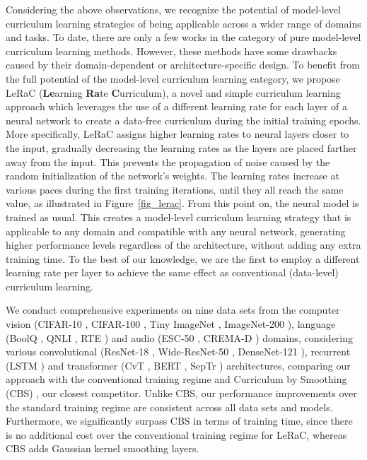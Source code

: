 \documentclass[10pt,twocolumn,letterpaper]{article}
\begin{document}
Considering the above observations, we recognize the potential of model-level curriculum learning strategies of being applicable across a wider range of domains and tasks. To date, there are only a few works \cite{Burduja-ICIP-2021,Karras-ICLR-2018,Sinha-NIPS-2020} in the category of pure model-level curriculum learning methods. However, these methods have some drawbacks caused by their domain-dependent or architecture-specific design. To benefit from the full potential of the model-level curriculum learning category, we propose LeRaC (\textbf{Le}arning \textbf{Ra}te \textbf{C}urriculum), a novel and simple curriculum learning approach which leverages the use of a different learning rate for each layer of a neural network to create a data-free curriculum during the initial training epochs. More specifically, LeRaC assigns higher learning rates to neural layers closer to the input, gradually decreasing the learning rates as the layers are placed farther away from the input. This prevents the propagation of noise caused by the random initialization of the network's weights. The learning rates increase at various paces during the first training iterations, until they all reach the same value, as illustrated in Figure~\ref{fig_lerac}. From this point on, the neural model is trained as usual. This creates a model-level curriculum learning strategy that is applicable to any domain and compatible with any neural network, generating higher performance levels regardless of the architecture, without adding any extra training time. To the best of our knowledge, we are the first to employ a different learning rate per layer to achieve the same effect as conventional (data-level) curriculum learning.

We conduct comprehensive experiments on nine data sets from the computer vision (CIFAR-10 \cite{Krizhevsky-TECHREP-2009}, CIFAR-100 \cite{Krizhevsky-TECHREP-2009}, Tiny ImageNet \cite{Russakovsky-IJCV-2015}, ImageNet-200 \cite{Russakovsky-IJCV-2015}), language (BoolQ \cite{Clark-NAACL-2019}, QNLI \cite{Wang-ICLR-2019}, RTE \cite{Wang-ICLR-2019}) and audio (ESC-50 \cite{Piczak-ACMMM-2015}, CREMA-D \cite{Cao-TAC-2014}) domains, considering various convolutional (ResNet-18 \cite{He-CVPR-2016}, Wide-ResNet-50 \cite{Zagoruyko-ArXiv-2016wide}, DenseNet-121 \cite{Gao-CVPR-2017}), recurrent (LSTM \cite{Hochreiter-NC-1997}) and transformer (CvT \cite{Wu-ICCV-2021}, BERT \cite{Devlin-NAACL-2019}, SepTr \cite{Ristea-ARXIV-2022}) architectures, comparing our approach with the conventional training regime and Curriculum by Smoothing (CBS) \cite{Sinha-NIPS-2020}, our closest competitor. Unlike CBS, our performance improvements over the standard training regime are consistent across all data sets and models. Furthermore, we significantly surpass CBS in terms of training time, since there is no additional cost over the conventional training regime for LeRaC, whereas CBS adds Gaussian kernel smoothing layers.
\end{document}
